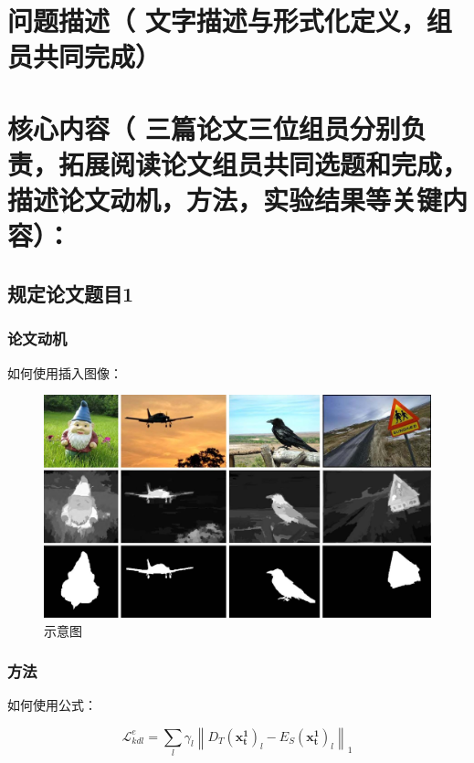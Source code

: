 \documentclass[12pt,AutoFakeBold]{article}
\newcommand{\revision}[1]{{\color{blue} #1}}
\begin{document}
\section{问题描述（\revision{文字描述与形式化定义，组员共同完成}）}


\section{核心内容（\revision{三篇论文三位组员分别负责，拓展阅读论文组员共同选题和完成，描述论文动机，方法，实验结果等关键内容}）：}

\subsection{规定论文题目1}
\subsubsection{论文动机}

如何使用插入图像：


\begin{figure}[h]
    \centering
    \includegraphics[width=1\linewidth]{figures/teaser.jpg}  
    \caption{\small 示意图}
    \label{fig:framework}
\end{figure}



\subsubsection{方法}

如何使用公式：

\vspace{-3pt}
\begin{equation}
 \mathcal{L}_{kdl}^{e}= \sum _{l} \gamma_{l} \left \| D_{T}(\mathbf{x_{t}^{1}})_{l} -  E_{S}(\mathbf{x_{t}^{1}} )_{l}  \right \|_{1}
\label{eq:kdl_e}
\end{equation} 
\end{document}

